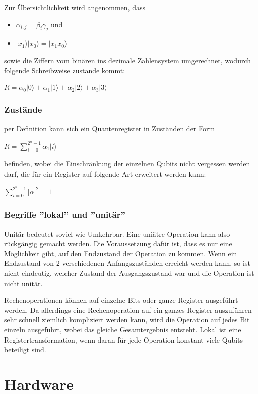Zur Übersichtlichkeit wird angenommen, dass
\begin{itemize}
	\item $\alpha_{i,j} = \beta_i\gamma_j$ und
	\item $|x_1\rangle|x_0\rangle = |x_1 x_0\rangle$
\end{itemize}
sowie die Ziffern vom binären ins dezimale Zahlensystem umgerechnet, wodurch folgende Schreibweise zustande kommt:

$R = \alpha_0|0\rangle+\alpha_1|1\rangle+\alpha_2|2\rangle+\alpha_3|3\rangle$


\subsubsection{Zustände}
\label{sec:Zustaende}

per Definition kann sich ein Quantenregister in Zuständen der Form

$R = \displaystyle\sum_{i=0}^{2^n-1} \alpha_1|i\rangle$

befinden, wobei die Einschränkung der einzelnen Qubits nicht vergessen werden darf, die für ein Register auf folgende Art erweitert werden kann:

$\displaystyle\sum_{i=0}^{2^n-1}  |\alpha|^2 = 1$


\subsubsection{Begriffe ''lokal'' und ''unitär''}
\label{sec:Begriffe lokal unitaer}

Unitär bedeutet soviel wie Umkehrbar. Eine uniätre Operation kann also rückgängig gemacht werden. Die Voraussetzung dafür ist, dass es nur eine Möglichkeit gibt, auf den Endzustand der Operation zu kommen. Wenn ein Endzustand von 2 verschiedenen Anfangszuständen erreicht werden kann, so ist nicht eindeutig, welcher Zustand der Ausgangszustand war und die Operation ist nicht unitär.

Rechenoperationen können auf einzelne Bits oder ganze Register ausgeführt werden. Da allerdings eine Rechenoperation auf ein ganzes Register auszuführen sehr schnell ziemlich kompliziert werden kann, wird die Operation auf jedes Bit einzeln ausgeführt, wobei das gleiche Gesamtergebnis entsteht. Lokal ist eine Registertransformation, wenn daran für jede Operation konstant viele Qubits beteiligt sind.

\newpage

\section{Hardware}
\label{sec:hardware}

